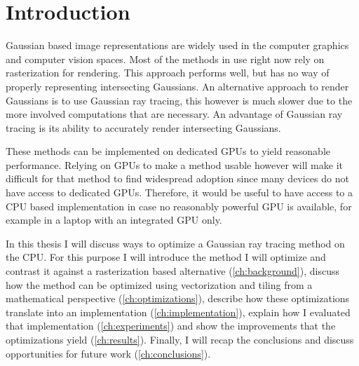 \documentclass[a4paper, 11pt]{memoir}
\begin{document}
    \mainmatter
    \chapter{Introduction}
    Gaussian based image representations are widely used in the computer graphics and computer vision spaces. Most of
    the methods in use right now rely on rasterization for rendering. This approach performs well, but has no
    way of properly representing intersecting Gaussians. An alternative approach to render Gaussians is to use Gaussian
    ray tracing, this however is much slower due to the more involved computations that are necessary. An advantage of
    Gaussian ray tracing is its ability to accurately render intersecting Gaussians.

    These methods can be implemented on dedicated GPUs to yield reasonable performance. Relying on GPUs to make a method
    usable however will make it difficult for that method to find widespread adoption since many devices do not have
    access to dedicated GPUs. Therefore, it would be useful to have access to a CPU based implementation in case no reasonably
    powerful GPU is available, for example in a laptop with an integrated GPU only.

    In this thesis I will discuss ways to optimize a Gaussian ray tracing method on the CPU. For this purpose I will
    introduce the method I will optimize and contrast it against a rasterization based alternative (\ref{ch:background}),
    discuss how the method can be optimized using vectorization and tiling from a mathematical perspective
    (\ref{ch:optimizations}), describe how these optimizations translate into an implementation (\ref{ch:implementation}),
    explain how I evaluated that implementation (\ref{ch:experiments})
    and show the improvements that the optimizations yield (\ref{ch:results}). Finally, I will recap the conclusions and
    discuss opportunities for future work (\ref{ch:conclusions}).

\end{document}
